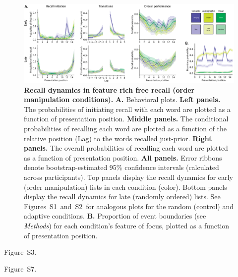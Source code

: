 \documentclass[11pt]{article}
\newcommand{\dynamicsRandom}{S1}
\newcommand{\dynamicsAdaptive}{S2}
\newcommand{\accuracyByList}{S3}
\newcommand{\recallInit}{S7}
\begin{document}
\begin{figure}[tp] \centering
\includegraphics[width=\textwidth]{figures/recall_dynamics}

\caption{\textbf{Recall dynamics in feature rich free recall (order
manipulation conditions).} \textbf{A.} Behavioral plots. \textbf{Left panels.}
The probabilities of initiating recall with each word are plotted as a function
of presentation position. \textbf{Middle panels.} The conditional probabilities
of recalling each word are plotted as a function of the relative position (Lag)
to the words recalled just-prior. \textbf{Right panels.} The overall
probabilities of recalling each word are plotted as a function of presentation
position. \textbf{All panels.} Error ribbons denote bootstrap-estimated 95\%
confidence intervals (calculated across participants). Top panels display the
recall dynamics for early (order manipulation) lists in each condition (color).
Bottom panels display the recall dynamics for late (randomly ordered) lists.
See Figures~\dynamicsRandom~and~\dynamicsAdaptive~for analogous plots for the
random (control) and adaptive conditions. \textbf{B.} Proportion of event
boundaries (see \textit{Methods}) for each condition's feature of focus,
plotted as a function of presentation position.}

    \label{fig:recall-dynamics}
\end{figure}

Figure~\accuracyByList.

Figure~\recallInit.
\end{document}
